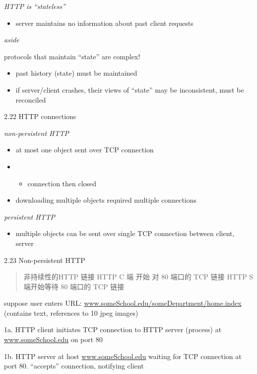 \documentclass[
]{article}
\begin{document}
\emph{HTTP is ``stateless''}

\begin{itemize}
\item
  server maintains no information about past client requests
\end{itemize}

\emph{aside}

protocols that maintain ``state'' are complex!

\begin{itemize}
\item
  past history (state) must be maintained
\item
  if server/client crashes, their views of ``state'' may be
  inconsistent, must be reconciled
\end{itemize}

2.22 HTTP connections

\emph{non-persistent HTTP}

\begin{itemize}
\item
  at most one object sent over TCP connection
\item
  \begin{itemize}
  \item
    connection then closed
  \end{itemize}
\item
  downloading multiple objects required multiple connections
\end{itemize}

\emph{persistent HTTP}

\begin{itemize}
\item
  multiple objects can be sent over single TCP connection between
  client, server
\end{itemize}

2.23 Non-persistent HTTP

\begin{quote}
非持续性的HTTP 链接 HTTP C 端 开始 对 80 端口的 TCP 链接 HTTP S
端开始等待 80 端口的 TCP 链接
\end{quote}

suppose user enters URL:
\url{www.someSchool.edu/someDepartment/home.index} (contains text,
references to 10 jpeg images)

1a. HTTP client initiates TCP connection to HTTP server (process) at
\url{www.someSchool.edu} on port 80

1b. HTTP server at host \url{www.someSchool.edu} waiting for TCP
connection at port 80. ``accepts'' connection, notifying client
\end{document}
